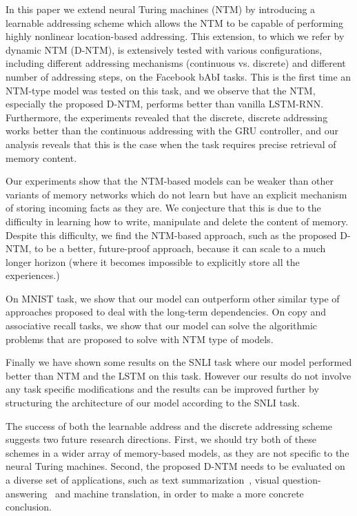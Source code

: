 \documentclass[12pt]{article}
\begin{document}
In this paper we extend neural Turing machines (NTM) by introducing a learnable addressing scheme which allows the NTM to be capable of performing highly nonlinear location-based addressing. This extension, to which we refer by dynamic NTM (D-NTM), is extensively tested with various configurations, including different addressing mechanisms (continuous vs. discrete) and different number of addressing steps, on the Facebook bAbI tasks. This is the first time an NTM-type model was tested on this task, and we observe that the NTM, especially the proposed D-NTM, performs better than vanilla LSTM-RNN. Furthermore, the experiments revealed that the discrete, discrete addressing works better than the continuous addressing with the GRU controller, and our analysis reveals that this is the case when the task requires precise retrieval of memory content. 

Our experiments show that the NTM-based models can be weaker than other variants of memory networks which do not learn but have an explicit mechanism of storing incoming facts as they are. We conjecture that this is due to the difficulty in learning how to write, manipulate and delete the content of memory. Despite this difficulty, we find the NTM-based approach, such as the proposed D-NTM, to be a better, future-proof approach, because it can scale to a much longer horizon (where it becomes impossible to explicitly store all the experiences.)

On MNIST task, we show that our model can outperform other similar type of approaches proposed to deal with the long-term dependencies. On copy and associative recall tasks, we show that our model can solve the algorithmic problems that are proposed to solve with NTM type of models.

Finally we have shown some results on the SNLI task where our model performed better than NTM and the LSTM on this task. However our results do not involve any task specific modifications and the results can be improved further by structuring the architecture of our model according to the SNLI task.

The success of both the learnable address and the discrete addressing scheme suggests two future research directions. First, we should try both of these schemes in a wider array of memory-based models, as they are not specific to the neural Turing machines. Second, the proposed D-NTM needs to be evaluated on a diverse set of applications, such as text summarization~\citep{para}, visual question-answering~\citep{vqa} and machine translation, in order to make a more concrete conclusion.



\end{document}
